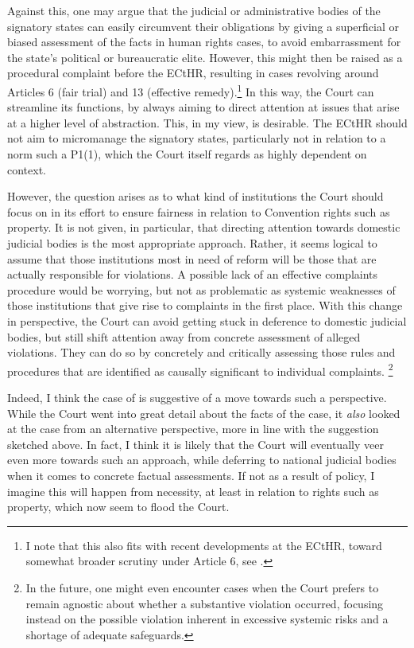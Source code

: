 Against this, one may argue that the judicial or administrative bodies of the signatory states can easily circumvent their obligations by giving a superficial or biased assessment of the facts in human rights cases, to avoid embarrassment for the state's political or bureaucratic elite. However, this might then be raised as a procedural complaint before the ECtHR, resulting in cases revolving around Articles 6 (fair trial) and 13 (effective remedy).\footnote{I note that this also fits with recent developments at the ECtHR, toward somewhat broader scrutiny under Article 6, see \cite{khamidov07}.}  In this way, the Court can streamline its functions, by always aiming to direct attention at issues that arise at a higher level of abstraction. This, in my view, is desirable. The ECtHR should not aim to micromanage the signatory states, particularly not in relation to a norm such a P1(1), which the Court itself regards as highly dependent on context.

However, the question arises as to what kind of institutions the Court should focus on in its effort to ensure fairness in relation to Convention rights such as property. It is not given, in particular, that directing attention towards domestic judicial bodies is the most appropriate approach. Rather, it seems logical to assume that those institutions most in need of reform will be those that are actually responsible for violations. A possible lack of an effective complaints procedure would be worrying, but not as problematic as systemic weaknesses of those institutions that give rise to complaints in the first place. With this change in perspective, the Court can avoid getting stuck in deference to domestic judicial bodies, but still shift attention away from concrete assessment of alleged violations. They can do so by concretely and critically assessing those rules and procedures that are identified as causally significant to individual complaints. \footnote{In the future, one might even encounter cases when the Court prefers to remain agnostic about whether a substantive violation occurred, focusing instead on the possible violation inherent in excessive systemic risks and a shortage of adequate safeguards.}

Indeed, I think the case of \textcite{hutten06} is suggestive of a move towards such a perspective. While the Court went into great detail about the facts of the case, it {\it also} looked at the case from an alternative perspective, more in line with the suggestion sketched above. In fact, I think it is likely that the Court will eventually veer even more towards such an approach, while deferring to national judicial bodies when it comes to concrete factual assessments. If not as a result of policy, I imagine this will happen from necessity, at least in relation to rights such as property, which now seem to flood the Court.

